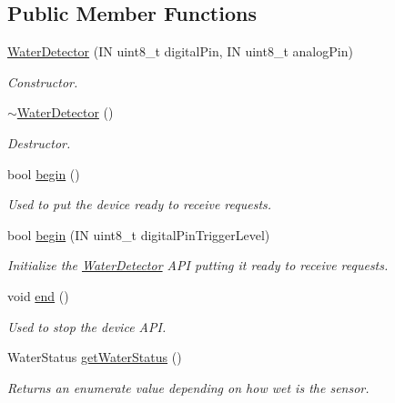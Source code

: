 \subsection*{Public Member Functions}
\begin{DoxyCompactItemize}
\item 
\hyperlink{class_easyuino_1_1_water_detector_a33690612b2b89efcfb97d4967b16c617}{Water\+Detector} (IN uint8\+\_\+t digital\+Pin, IN uint8\+\_\+t analog\+Pin)
\begin{DoxyCompactList}\small\item\em Constructor. \end{DoxyCompactList}\item 
\mbox{\label{class_easyuino_1_1_water_detector_af63f706076f6941135412d57c1ddc5cf}} 
\hyperlink{class_easyuino_1_1_water_detector_af63f706076f6941135412d57c1ddc5cf}{$\sim$\+Water\+Detector} ()
\begin{DoxyCompactList}\small\item\em Destructor. \end{DoxyCompactList}\item 
bool \hyperlink{class_easyuino_1_1_water_detector_af7a0ec32d6abcb8c1060f493525d5228}{begin} ()
\begin{DoxyCompactList}\small\item\em Used to put the device ready to receive requests. \end{DoxyCompactList}\item 
bool \hyperlink{class_easyuino_1_1_water_detector_a06ac56298c56026691d7d6a9dbb63748}{begin} (IN uint8\+\_\+t digital\+Pin\+Trigger\+Level)
\begin{DoxyCompactList}\small\item\em Initialize the \hyperlink{class_easyuino_1_1_water_detector}{Water\+Detector} A\+PI putting it ready to receive requests. \end{DoxyCompactList}\item 
void \hyperlink{class_easyuino_1_1_water_detector_a9c1473536f47b2a7d8e1f8fb1bf5f3fd}{end} ()
\begin{DoxyCompactList}\small\item\em Used to stop the device A\+PI. \end{DoxyCompactList}\item 
Water\+Status \hyperlink{class_easyuino_1_1_water_detector_a0dfefd3b3aa2ed21f30ceb8041a8652a}{get\+Water\+Status} ()
\begin{DoxyCompactList}\small\item\em Returns an enumerate value depending on how wet is the sensor. \end{DoxyCompactList}\item 

\end{DoxyCompactItemize}

